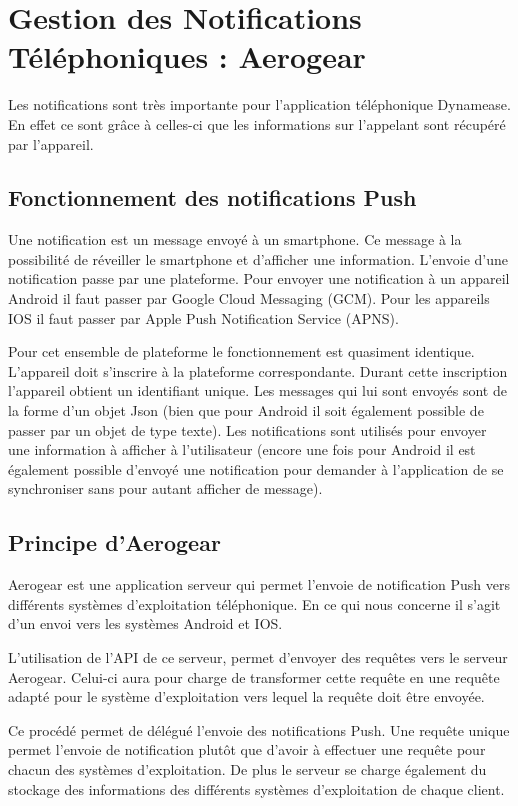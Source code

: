 \section{Gestion des Notifications Téléphoniques : Aerogear}

Les notifications sont très importante pour l'application téléphonique Dynamease. En effet ce sont grâce à celles-ci que les informations sur l'appelant sont récupéré par l'appareil. 

\subsection{Fonctionnement des notifications Push}

Une notification est un message envoyé à un smartphone. Ce message à la possibilité de réveiller le smartphone et d'afficher une information. L'envoie d'une notification passe par une plateforme. Pour envoyer une notification à un appareil Android il faut passer par Google Cloud Messaging (GCM). Pour les appareils IOS il faut passer par Apple Push Notification Service (APNS).

Pour cet ensemble de plateforme le fonctionnement est quasiment identique. L'appareil doit s'inscrire à la plateforme correspondante.
Durant cette inscription l'appareil obtient un identifiant unique. Les messages qui lui sont envoyés sont de la forme d'un objet Json (bien que pour Android il soit également possible de passer par un objet de type texte). Les notifications sont utilisés pour envoyer une information à afficher à l'utilisateur (encore une fois pour Android il est également possible d'envoyé une notification pour demander à l'application de se synchroniser sans pour autant afficher de message).

\subsection{Principe d'Aerogear}

Aerogear est une application serveur qui permet l'envoie de notification Push vers différents systèmes d'exploitation téléphonique. En ce qui nous concerne il s'agit d'un envoi vers les systèmes Android et IOS.

L'utilisation de l'API de ce serveur, permet d'envoyer des requêtes vers le serveur Aerogear. Celui-ci aura pour charge de transformer cette requête en une requête adapté pour le système d'exploitation vers lequel la requête doit être envoyée.

Ce procédé permet de délégué l'envoie des notifications Push. Une requête unique permet l'envoie de notification plutôt que d'avoir à effectuer une requête pour chacun des systèmes d'exploitation. De plus le serveur se charge également du stockage des informations des différents systèmes d'exploitation de chaque client.

